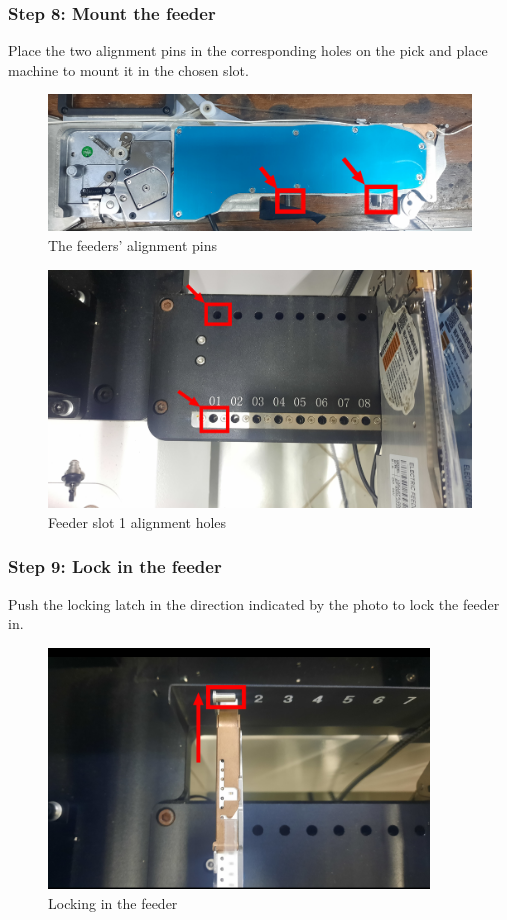 \documentclass[a4paper,10pt]{report}
\begin{document}
\subsubsection{Step 8: Mount the feeder}
Place the two alignment pins in the corresponding holes on the pick and place machine to mount it in the chosen slot.
\begin{figure}[!htb]
 \centering
 \includegraphics[width=1\textwidth]{images/alignment_pins.png}
 \caption{The feeders' alignment pins}
\end{figure}
\begin{figure}[!htb]
 \centering
 \includegraphics[width=1\textwidth]{images/alignment_holes.png}
 \caption{Feeder slot 1 alignment holes}
\end{figure}
\newpage
\subsubsection{Step 9: Lock in the feeder}
Push the locking latch in the direction indicated by the photo to lock the feeder in.
\begin{figure}[!htb]
 \centering
 \includegraphics[width=0.9\textwidth]{images/step9.png}
 \caption{Locking in the feeder}
\end{figure}
\end{document}
